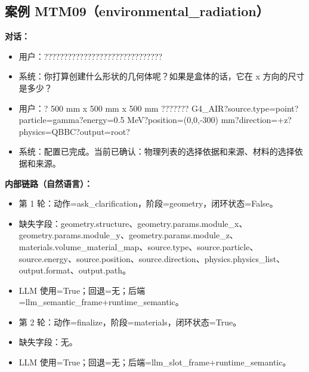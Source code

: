 \documentclass[11pt]{ctexart}
\begin{document}
\subsection{案例 MTM09（environmental\_radiation）}
\textbf{对话：}
\begin{itemize}
\item 用户：??????????????????????????????
\item 系统：你打算创建什么形状的几何体呢？如果是盒体的话，它在 x 方向的尺寸是多少？
\item 用户：? 500 mm x 500 mm x 500 mm ??????? G4\_AIR?source.type=point?particle=gamma?energy=0.5 MeV?position=(0,0,-300) mm?direction=+z?physics=QBBC?output=root?
\item 系统：配置已完成。当前已确认：物理列表的选择依据和来源、材料的选择依据和来源。
\end{itemize}
\textbf{内部链路（自然语言）：}
\begin{itemize}
\item 第 1 轮：动作=ask\_clarification，阶段=geometry，闭环状态=False。
\item 缺失字段：geometry.structure、geometry.params.module\_x、geometry.params.module\_y、geometry.params.module\_z、materials.volume\_material\_map、source.type、source.particle、source.energy、source.position、source.direction、physics.physics\_list、output.format、output.path。
\item LLM 使用=True；回退=无；后端=llm\_semantic\_frame+runtime\_semantic。
\item 第 2 轮：动作=finalize，阶段=materials，闭环状态=True。
\item 缺失字段：无。
\item LLM 使用=True；回退=无；后端=llm\_slot\_frame+runtime\_semantic。
\end{itemize}
\end{document}
